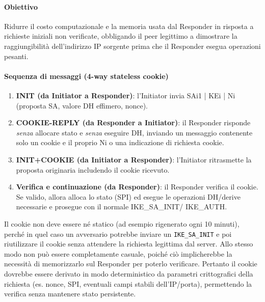 \documentclass[a4paper, 11pt]{article}
\begin{document}
\paragraph{Obiettivo}
Ridurre il costo computazionale e la memoria usata dal Responder in risposta a richieste iniziali non verificate, obbligando il peer legittimo a dimostrare la raggiungibilità dell'indirizzo IP sorgente prima che il Responder esegua operazioni pesanti.

\paragraph{Sequenza di messaggi (4-way stateless cookie)}
\begin{enumerate}
    \item \textbf{INIT (da Initiator a Responder)}: l'Initiator invia SAi1 | KEi | Ni (proposta SA, valore DH effimero, nonce).
    \item \textbf{COOKIE-REPLY (da Responder a Initiator)}: il Responder risponde \emph{senza} allocare stato e \emph{senza} eseguire DH, inviando un messaggio contenente solo un cookie e il proprio Ni o una indicazione di richiesta cookie.
    \item \textbf{INIT+COOKIE (da Initiator a Responder)}: l'Initiator ritrasmette la proposta originaria includendo il cookie ricevuto.
    \item \textbf{Verifica e continuazione (da Responder)}: il Responder verifica il cookie. Se valido, allora alloca lo stato (SPI) ed esegue le operazioni DH/derive necessarie e prosegue con il normale IKE\_SA\_INIT/ IKE\_AUTH.
\end{enumerate}

Il cookie non deve essere né statico (ad esempio rigenerato ogni 10 minuti), perché in quel caso un avversario potrebbe inviare un \texttt{IKE\_SA\_INIT} e poi riutilizzare il cookie senza attendere la richiesta legittima dal server. Allo stesso modo non può essere completamente casuale, poiché ciò implicherebbe la necessità di memorizzarlo sul Responder per poterlo verificare. Pertanto il cookie dovrebbe essere derivato in modo deterministico da parametri crittografici della richiesta (es. nonce, SPI, eventuali campi stabili dell'IP/porta), permettendo la verifica senza mantenere stato persistente.
\end{document}
